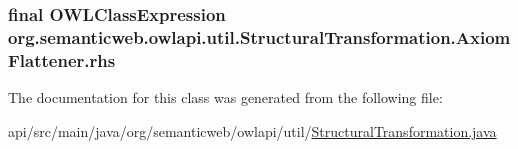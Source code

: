 \hypertarget{classorg_1_1semanticweb_1_1owlapi_1_1util_1_1_structural_transformation_1_1_axiom_flattener_aaf931e36c84b350f97ce5ec6f370b2ef}{
\subsubsection[{rhs}]{\setlength{\rightskip}{0pt plus 5cm}final {\bf O\-W\-L\-Class\-Expression} org.\-semanticweb.\-owlapi.\-util.\-Structural\-Transformation.\-Axiom\-Flattener.\-rhs\hspace{0.3cm}{\ttfamily [private]}}}\label{classorg_1_1semanticweb_1_1owlapi_1_1util_1_1_structural_transformation_1_1_axiom_flattener_aaf931e36c84b350f97ce5ec6f370b2ef}


The documentation for this class was generated from the following file\-:\begin{DoxyCompactItemize}
\item 
api/src/main/java/org/semanticweb/owlapi/util/\hyperlink{_structural_transformation_8java}{Structural\-Transformation.\-java}\end{DoxyCompactItemize}
